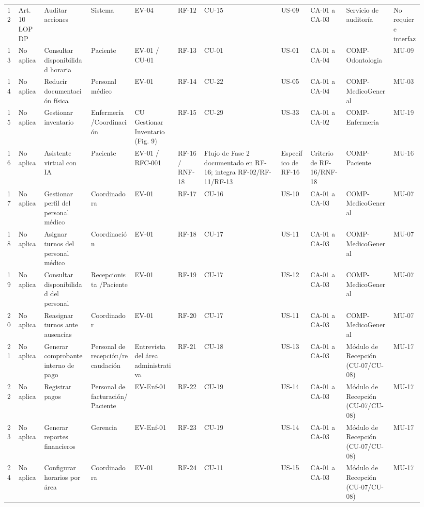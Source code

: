 \documentclass[11pt,a4paper]{article}
\begin{document}
\begin{longtable}{p{} p{} p{} p{} p{} p{} p{} p{} p{} p{} p{}}
		12 & Art. 10 LOPDP & Auditar acciones & Sistema & EV-04 & RF-12 & CU-15 & US-09 & CA-01 a CA-03 & Servicio de auditoría & No requiere interfaz \\
		13 & No aplica & Consultar disponibilidad horaria & Paciente & EV-01 / CU-01 & RF-13 & CU-01 & US-01 & CA-01 a CA-04 & COMP-Odontologia & MU-09 \\
		14 & No aplica & Reducir documentación física & Personal médico & EV-01 & RF-14 & CU-22 & US-05 & CA-01 a CA-04 & COMP-MedicoGeneral & MU-03 \\
		15 & No aplica & Gestionar inventario & Enfermería
		/Coordinación & CU Gestionar Inventario (Fig. 9) & RF-15 & CU-29 & US-33 & CA-01 a CA-02 & COMP-Enfermeria & MU-19 \\	
		16 & No aplica & Asistente virtual con IA & Paciente & EV-01 / RFC-001 & RF-16 / RNF-18 & Flujo de Fase 2 documentado en RF-16; integra RF-02/RF-11/RF-13 & Específico de RF-16 & Criterio de RF-16/RNF-18 & COMP-Paciente & MU-16 \\
		17 & No aplica & Gestionar perfil del personal médico & Coordinadora & EV-01 & RF-17 & CU-16 & US-10 & CA-01 a CA-03 & COMP-MedicoGeneral & MU-07 \\
		18 & No aplica & Asignar turnos del personal médico & Coordinación & EV-01 & RF-18 & CU-17 & US-11 & CA-01 a CA-03 & COMP-MedicoGeneral & MU-07 \\
		19 & No aplica & Consultar disponibilidad del personal & Recepcionista
		/Paciente & EV-01 & RF-19 & CU-17 & US-12 & CA-01 a CA-03 & COMP-MedicoGeneral & MU-07 \\
		20 & No aplica & Reasignar turnos ante ausencias & Coordinador & EV-01 & RF-20 & CU-17 & US-11 & CA-01 a CA-03 & COMP-MedicoGeneral & MU-07 \\
		21 & No aplica & Generar comprobante interno de pago & Personal de recepción/recaudación & Entrevista del área administrativa & RF-21 & CU-18 & US-13 & CA-01 a CA-03 & Módulo de Recepción (CU-07/CU-08) & MU-17 \\
		22 & No aplica & Registrar pagos & Personal de facturación/Paciente & EV-Enf-01 & RF-22 & CU-19 & US-14 & CA-01 a CA-03 & Módulo de Recepción (CU-07/CU-08) & MU-17 \\
		23 & No aplica & Generar reportes financieros & Gerencia & EV-Enf-01 & RF-23 & CU-19 & US-14 & CA-01 a CA-03 & Módulo de Recepción (CU-07/CU-08) & MU-17 \\
		24 & No aplica & Configurar horarios por área & Coordinadora & EV-01 & RF-24 & CU-11 & US-15 & CA-01 a CA-03 & Módulo de Recepción (CU-07/CU-08) & MU-17 \\

\end{longtable}
\end{document}
